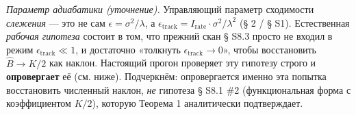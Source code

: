 \documentclass[12pt]{iopart}
\begin{document}
\emph{Параметр адиабатики (уточнение).} Управляющий параметр сходимости \emph{слежения} --- это не сам \(\epsilon = \sigma^2/\lambda\), а \(\epsilon_{\text{track}} = I_{\text{rate}}\cdot\sigma^2/\lambda^2\) (§ 2 / § S1). Естественная \emph{рабочая гипотеза} состоит в том, что прежний скан \cite{Andriishin2026b} § S8.3 просто не входил в режим \(\epsilon_{\text{track}} \ll 1\), и достаточно «толкнуть \(\epsilon_{\text{track}} \to 0\)», чтобы восстановить \(\hat B \to K/2\) как наклон. Настоящий прогон проверяет эту гипотезу строго и \textbf{опровергает} её (см. ниже). Подчеркнём: опровергается именно эта попытка восстановить численный наклон, \emph{не} гипотеза § S8.1 \#2 \cite{Andriishin2026b} (функциональная форма с коэффициентом \(K/2\)), которую Теорема 1 аналитически подтверждает.
\end{document}

